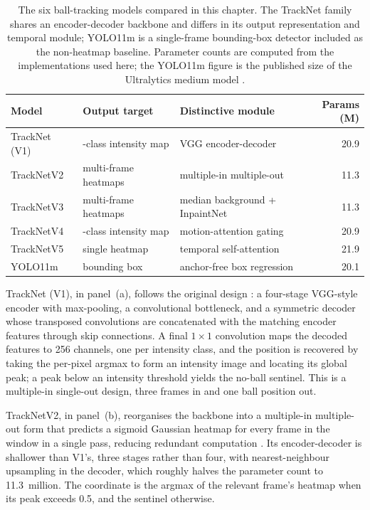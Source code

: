 \begin{table}[t]
  \centering
  \small
  \setlength{\tabcolsep}{4pt}
  \caption{The six ball-tracking models compared in this chapter. The TrackNet
    family shares an encoder-decoder backbone and differs in its output
    representation and temporal module; YOLO11m is a single-frame bounding-box
    detector included as the non-heatmap baseline. Parameter counts are computed
    from the implementations used here; the YOLO11m figure is the published size
    of the Ultralytics medium model \cite{jocher2024yolo11}.}
  \label{tab:ball-models}
  \begin{tabular}{@{}l >{\raggedright\arraybackslash}p{3.0cm} >{\raggedright\arraybackslash}p{4.8cm} r@{}}
    \toprule
    Model & Output target  & Distinctive module & \makecell[r]{Params\\(M)} \\
    \midrule
    TrackNet (V1) & 256-class intensity map  & VGG encoder-decoder & 20.9 \\
    TrackNetV2    & multi-frame heatmaps      & multiple-in multiple-out & 11.3 \\
    TrackNetV3    & multi-frame heatmaps      & median background + InpaintNet & 11.3 \\
    TrackNetV4    & 256-class intensity map & motion-attention gating & 20.9 \\
    TrackNetV5    & single heatmap          & temporal self-attention & 21.9 \\
    YOLO11m       & bounding box            & anchor-free box regression & 20.1 \\
    \bottomrule
  \end{tabular}
\end{table}

TrackNet (V1), in panel~(a), follows the original design
\cite{huang2019tracknet}: a
four-stage VGG-style encoder with max-pooling, a convolutional bottleneck, and a
symmetric decoder whose transposed convolutions are concatenated with the
matching encoder features through skip connections. A final $1 \times 1$
convolution maps the decoded features to 256 channels, one per intensity class,
and the position is recovered by taking the per-pixel argmax to form an
intensity image and locating its global peak; a peak below an intensity
threshold yields the no-ball sentinel. This is a multiple-in single-out design,
three frames in and one ball position out.

TrackNetV2, in panel~(b), reorganises the backbone into a multiple-in
multiple-out form that predicts a sigmoid Gaussian heatmap for every frame in
the window in a single pass, reducing redundant computation
\cite{sun2020tracknetv2}. Its
encoder-decoder is shallower than V1's, three stages rather than four, with
nearest-neighbour upsampling in the decoder, which roughly halves the parameter
count to 11.3~million. The coordinate is the argmax of the relevant frame's
heatmap when its peak exceeds 0.5, and the sentinel otherwise.

